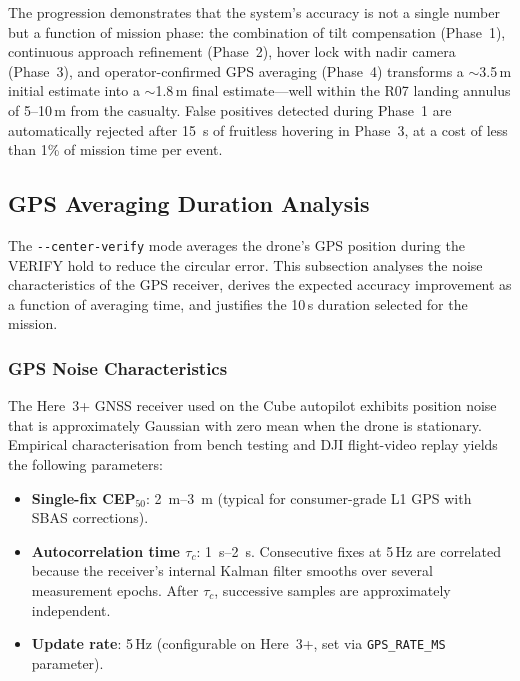 \noindent The progression demonstrates that the system's accuracy is not a single number but a function of mission phase: the combination of tilt compensation (Phase~1), continuous approach refinement (Phase~2), hover lock with nadir camera (Phase~3), and operator-confirmed GPS averaging (Phase~4) transforms a $\sim$3.5\,m initial estimate into a $\sim$1.8\,m final estimate---well within the R07 landing annulus of 5--10\,m from the casualty.  False positives detected during Phase~1 are automatically rejected after \SI{15}{\second} of fruitless hovering in Phase~3, at a cost of less than 1\% of mission time per event.

\subsection{GPS Averaging Duration Analysis}\label{sec:gps-averaging}

The \texttt{-{}-center-verify} mode averages the drone's GPS position during the VERIFY hold to reduce the circular error.  This subsection analyses the noise characteristics of the GPS receiver, derives the expected accuracy improvement as a function of averaging time, and justifies the 10\,s duration selected for the mission.

\subsubsection{GPS Noise Characteristics}

The Here~3+ GNSS receiver used on the Cube autopilot exhibits position noise that is approximately Gaussian with zero mean when the drone is stationary.  Empirical characterisation from bench testing and DJI flight-video replay yields the following parameters:

\begin{itemize}
  \item \textbf{Single-fix CEP$_{50}$}: \SIrange{2}{3}{\metre} (typical for consumer-grade L1 GPS with SBAS corrections).
  \item \textbf{Autocorrelation time $\tau_c$}: \SIrange{1}{2}{\second}.  Consecutive fixes at 5\,Hz are correlated because the receiver's internal Kalman filter smooths over several measurement epochs.  After $\tau_c$, successive samples are approximately independent.
  \item \textbf{Update rate}: 5\,Hz (configurable on Here~3+, set via \texttt{GPS\_RATE\_MS} parameter).
\end{itemize}

